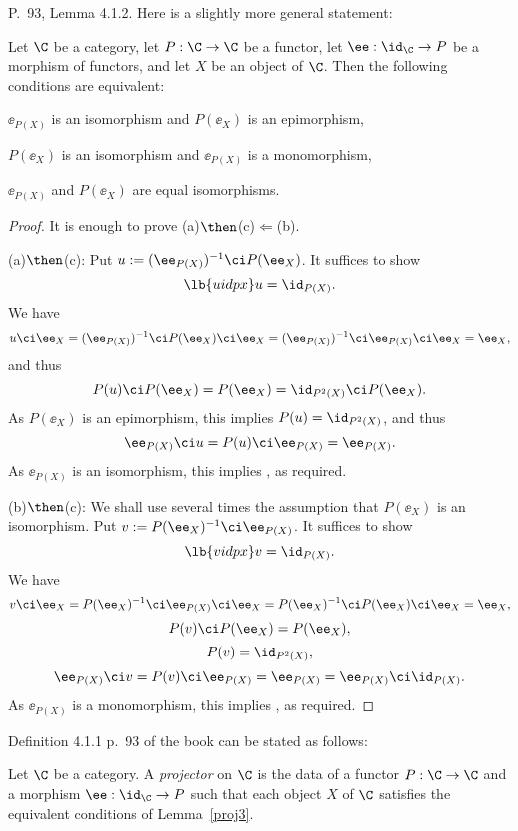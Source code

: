 \documentclass[12pt]{article}
\theoremstyle{remark}
\theoremstyle{definition}
\begin{document}
\begin{s}
P.~93, Lemma 4.1.2. Here is a slightly more general statement:

\begin{lem}
Let $\C$ be a category, let $P:\C\to\C$ be a functor, let $\ee:\id_\C\to P$ be a morphism of functors, and let $X$ be an object of $\C$. Then the following conditions are equivalent:

 $\ee_{P(X)}$ is an isomorphism and $P(\ee_X)$ is an epimorphism,

 $P(\ee_X)$ is an isomorphism and $\ee_{P(X)}$ is a monomorphism,

 $\ee_{P(X)}$ and $P(\ee_X)$ are equal isomorphisms.
\end{lem}

\begin{proof} It is enough to prove (a)$\then$(c)$\Leftarrow$(b). 

\nn(a)$\then$(c): Put $u:=(\ee_{P(X)})^{-1}\ci P(\ee_X)$. It suffices to show 
\begin{equation}\lb{uidpx}
u=\id_{P(X)}.
\end{equation} 
We have 
$$
u\ci\ee_X=(\ee_{P(X)})^{-1}\ci P(\ee_X)\ci\ee_X=(\ee_{P(X)})^{-1}\ci\ee_{P(X)}\ci\ee_X=\ee_X,
$$ 
and thus 
$$
P(u)\ci P(\ee_X)=P(\ee_X)=\id_{P^2(X)}\ci P(\ee_X).
$$
As $P(\ee_X)$ is an epimorphism, this implies $P(u)=\id_{P^2(X)}$, and thus 
$$
\ee_{P(X)}\ci u=P(u)\ci\ee_{P(X)}=\ee_{P(X)}.
$$ 
As $\ee_{P(X)}$ is an isomorphism, this implies , as required.

\nn(b)$\then$(c): We shall use several times the assumption that $P(\ee_X)$ is an isomorphism. Put $v:=P(\ee_X)^{-1}\ci\ee_{P(X)}$. It suffices to show 
%
\begin{equation}\lb{vidpx}
v=\id_{P(X)}.
\end{equation}
%
We have 
$$
v\ci\ee_X=P(\ee_X)^{-1}\ci\ee_{P(X)}\ci\ee_X=P(\ee_X)^{-1}\ci P(\ee_X)\ci\ee_X=\ee_X,
$$ 
$$
P(v)\ci P(\ee_X)=P(\ee_X),
$$
$$
P(v)=\id_{P^2(X)},
$$
$$
\ee_{P(X)}\ci v=P(v)\ci\ee_{P(X)}=\ee_{P(X)}=\ee_{P(X)}\ci\id_{P(X)}.
$$ 
As $\ee_{P(X)}$ is a monomorphism, this implies , as required. 
\end{proof}

Definition 4.1.1 p.~93 of the book can be stated as follows:

\begin{df} 
Let $\C$ be a category. A {\em projector} on $\C$ is the data of a functor $P:\C\to\C$ and a morphism $\ee:\id_\C\to P$ such that each object $X$ of $\C$ satisfies the equivalent conditions of Lemma~\ref{proj3}. 
\end{df}
\end{s}
\end{document}
